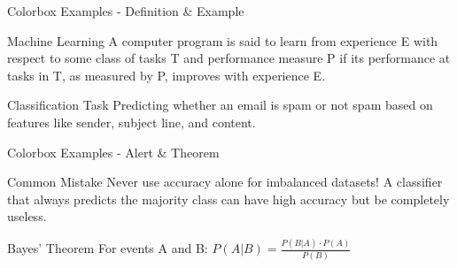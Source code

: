 \documentclass[usenames,dvipsnames]{beamer}
\begin{document}
\begin{frame}{Colorbox Examples - Definition \& Example}
\begin{definitionbox}{Machine Learning}
A computer program is said to learn from experience E with respect to some class of tasks T and performance measure P if its performance at tasks in T, as measured by P, improves with experience E.
\end{definitionbox}

\vspace{0.5cm}

\begin{examplebox}{Classification Task}
Predicting whether an email is spam or not spam based on features like sender, subject line, and content.
\end{examplebox}
\end{frame}

\begin{frame}{Colorbox Examples - Alert \& Theorem}
\begin{alertbox}{Common Mistake}
Never use accuracy alone for imbalanced datasets! A classifier that always predicts the majority class can have high accuracy but be completely useless.
\end{alertbox}

\vspace{0.5cm}

\begin{theorembox}{Bayes' Theorem}
For events A and B: $P(A|B) = \frac{P(B|A) \cdot P(A)}{P(B)}$
\end{theorembox}
\end{frame}
\end{document}
